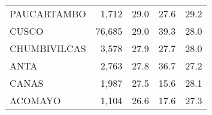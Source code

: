 \begin{tabular}{lrrrr}
	\cellcolor[HTML]{FD6864}PAUCARTAMBO                                     & 1,712                                                                 & 29.0                                                                             & 27.6                                                                        & 29.2                                                                                \\
	\cellcolor[HTML]{FD6864}CUSCO                                           & 76,685                                                                & 29.0                                                                             & 39.3                                                                        & 28.0                                                                                \\
	\cellcolor[HTML]{FD6864}CHUMBIVILCAS                                    & 3,578                                                                 & 27.9                                                                             & 27.7                                                                        & 28.0                                                                                \\
	\cellcolor[HTML]{FD6864}ANTA                                            & 2,763                                                                 & 27.8                                                                             & 36.7                                                                        & 27.2                                                                                \\
	\cellcolor[HTML]{FD6864}CANAS                                           & 1,987                                                                 & 27.5                                                                             & 15.6                                                                        & 28.1                                                                                \\
	\cellcolor[HTML]{FD6864}ACOMAYO                                         & 1,104                                                                 & 26.6                                                                             & 17.6                                                                        & 27.3                                                                                \\

\end{tabular}
